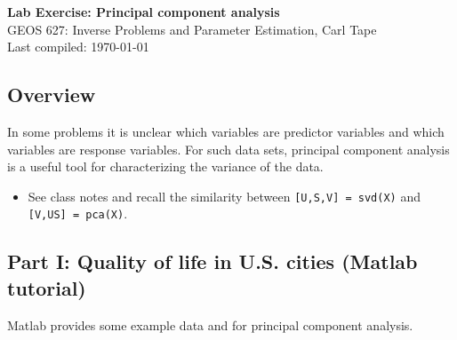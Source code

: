 \documentclass[11pt,titlepage,fleqn]{article}
\begin{document}

\begin{spacing}{1.2}
\centering
{\large \bf Lab Exercise: Principal component analysis} \\
GEOS 627: Inverse Problems and Parameter Estimation, Carl Tape \\
Last compiled: \today
\end{spacing}


\subsection*{Overview}

In some problems it is unclear which variables are predictor variables and which variables are response variables. For such data sets, principal component analysis is a useful tool for characterizing the variance of the data.

\begin{itemize}
\item See class notes and recall the similarity between \verb+[U,S,V] = svd(X)+ and \verb+[V,US] = pca(X)+.


\end{itemize}


\subsection*{Part I: Quality of life in U.S. cities (Matlab tutorial)}

Matlab provides some example data and for principal component analysis.
\end{document}
